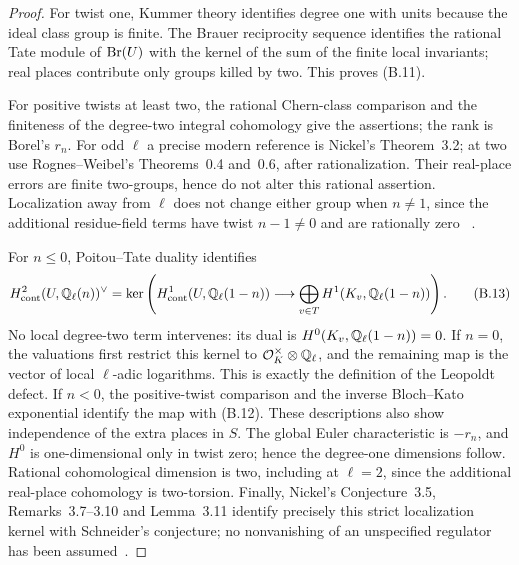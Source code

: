 \begin{proof}
For twist one, Kummer theory identifies degree one with units because
the ideal class group is finite.  The Brauer reciprocity sequence
identifies the rational Tate module of \(\operatorname{Br}(U)\) with the kernel of
the sum of the finite local invariants; real places contribute only
groups killed by two.  This proves (B.11).

For positive twists at least two, the rational Chern-class comparison
and the finiteness of the degree-two integral cohomology give the
assertions; the rank is Borel's \(r_n\).  For odd \(\ell\) a precise
modern reference is Nickel's Theorem~3.2; at two use Rognes--Weibel's
Theorems~0.4 and~0.6, after rationalization.  Their real-place errors
are finite two-groups, hence do not alter this rational assertion.
Localization away from \(\ell\) does not change either group when
\(n\ne1\), since the additional residue-field terms have twist
\(n-1\ne0\) and are rationally zero~\cite[Theorem~3.2]{BNickel2022}
\cite[Theorems~0.4 and~0.6]{BRognesWeibel2000}.

For \(n\le0\), Poitou--Tate duality identifies
\[
 H^2_{\mathrm{cont}}(U,\mathbb Q_\ell(n))^\vee=
 \ker\left(H^1_{\mathrm{cont}}(U,\mathbb Q_\ell(1-n))
 \longrightarrow\bigoplus_{v\in T}H^1(K_v,\mathbb Q_\ell(1-n))\right).
 \tag{B.13}
\]
No local degree-two term intervenes: its dual is
\(H^0(K_v,\mathbb Q_\ell(1-n))=0\).  If \(n=0\), the valuations first
restrict this kernel to \(\mathcal O_K^\times\otimes\mathbb Q_\ell\), and
the remaining map is the vector of local \(\ell\)-adic logarithms.
This is exactly the definition of the Leopoldt defect.  If \(n<0\),
the positive-twist comparison and the inverse Bloch--Kato exponential
identify the map with (B.12).  These descriptions also show independence
of the extra places in \(S\).  The global Euler characteristic is
\(-r_n\), and \(H^0\) is one-dimensional only in twist zero; hence
the degree-one dimensions follow.  Rational cohomological dimension is
two, including at \(\ell=2\), since the additional real-place
cohomology is two-torsion.  Finally, Nickel's Conjecture~3.5,
Remarks~3.7--3.10 and Lemma~3.11 identify precisely this strict
localization kernel with Schneider's conjecture; no nonvanishing of
an unspecified regulator has been assumed~\cite[\S3.6]{BNickel2022}.
\end{proof}

